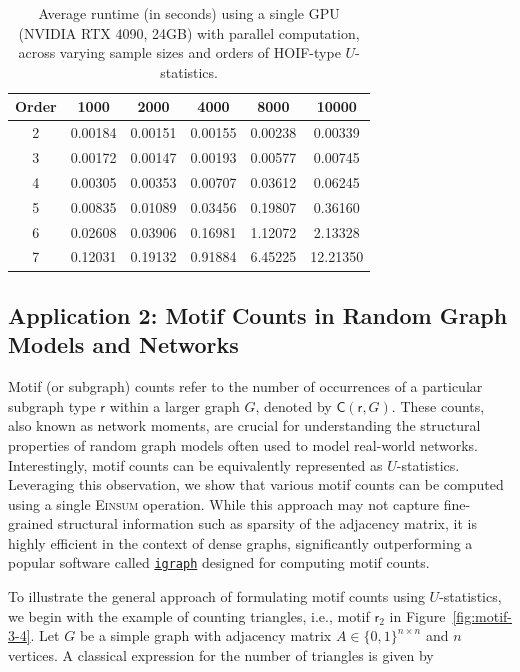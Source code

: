\documentclass[letterpaper,11pt]{article}
\def\Einsum{\textsc{Einsum}}
\newcommand{\libref}[2]{\href{#2}{\texttt{#1}}}
\def\sfr{\mathsf{r}}
\newcommand{\motifrg}[2]{\mathsf{C}(#1,#2)}
\def\igraph{\libref{igraph}{https://igraph.org/}}
\begin{document}
\begin{bibunit}[plainnat]
\begin{table}[ht]
\centering
\caption{Average runtime (in seconds) using a single GPU (NVIDIA RTX 4090, 24GB) with parallel computation, across varying sample sizes and orders of HOIF-type $U$-statistics.}
\label{tab:HOIF_GPU}
\begin{tabular}{cccccc}
\toprule
\textbf{Order} & \textbf{1000} & \textbf{2000} & \textbf{4000} & \textbf{8000} & \textbf{10000} \\
\midrule
2 & 0.00184 & 0.00151 & 0.00155 & 0.00238 & 0.00339 \\
3 & 0.00172 & 0.00147 & 0.00193 & 0.00577 & 0.00745 \\
4 & 0.00305 & 0.00353 & 0.00707 & 0.03612 & 0.06245 \\
5 & 0.00835 & 0.01089 & 0.03456 & 0.19807 & 0.36160 \\
6 & 0.02608 & 0.03906 & 0.16981 & 1.12072 & 2.13328 \\
7 & 0.12031 & 0.19132 & 0.91884 & 6.45225 & 12.21350 \\
\bottomrule
\end{tabular}
\end{table}

\subsection{Application 2: Motif Counts in Random Graph Models and Networks}
\label{sec:example_motif}

Motif (or subgraph) counts refer to the number of occurrences of a particular subgraph type $\sfr$ within a larger graph $G$, denoted by $\motifrg{\sfr}{G}$. These counts, also known as network moments, are crucial for understanding the structural properties of random graph models often used to model real-world networks. %
Interestingly, motif counts can be equivalently represented as $U$-statistics. Leveraging this observation, we show that various motif counts can be computed using a single \Einsum{} operation. While this approach may not capture fine-grained structural information such as sparsity of the adjacency matrix, it is highly efficient in the context of dense graphs, significantly outperforming a popular software called \igraph{} designed for computing motif counts.

\iffalse
To illustrate the general approach of formulating motif counts using $U$-statistics, we begin with the example of counting triangles, i.e., motif $\sfr_2$ in Figure~\ref{fig:motif-3-4}. Let $G$ be a simple graph with adjacency matrix $A \in \{0,1\}^{n \times n}$ and $n$ vertices. A classical expression for the number of triangles is given by


\end{bibunit}
\end{document}
